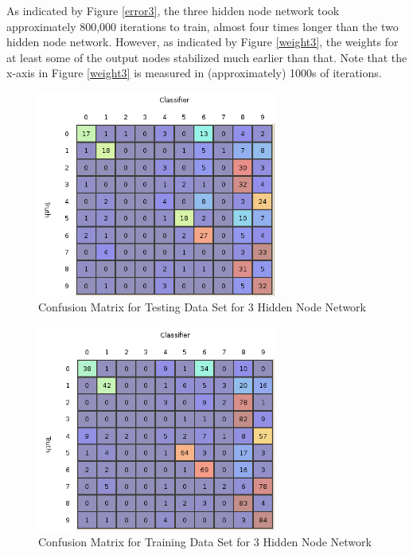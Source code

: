 \documentclass{article}
\begin{document}
As indicated by Figure \ref{error3}, the three hidden node network took approximately 800,000 iterations to train, almost four times longer than the two hidden node network. However, as indicated by Figure \ref{weight3}, the weights for at least some of the output nodes stabilized much earlier than that. Note that the x-axis in Figure \ref{weight3} is measured in (approximately) 1000s of iterations.

\begin{figure}
\centering
\includegraphics[width=0.7\textwidth]{data/final/3_test_confusion.png}
\caption{Confusion Matrix for Testing Data Set for 3 Hidden Node Network}
\label{testconfusion3}
\end{figure}

\begin{figure}
\centering
\includegraphics[width=0.7\textwidth]{data/final/3_train_confusion.png}
\caption{Confusion Matrix for Training Data Set for 3 Hidden Node Network}
\label{trainconfusion3}
\end{figure}
\end{document}
